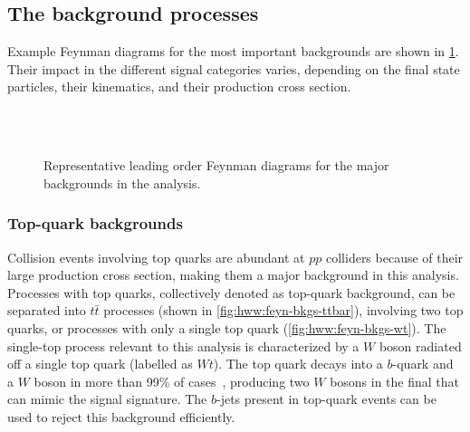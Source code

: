 \subsection{The background processes}
Example Feynman diagrams for the most important backgrounds are shown in \cref{fig:hww:feyn-bkgs}.
Their impact in the different signal categories varies, depending on the final state particles, their kinematics, and their production cross section. 
\captionsetup[subfloat]{captionskip=10pt}
\begin{figure}[ht]
     \hspace{5em}
     \\
     \hspace{5em}
     \\
     \hspace{5em}
    \caption[Feynman diagrams for the major backgrounds.]{Representative leading order Feynman diagrams for the major backgrounds in the \HWW analysis.} 
    \label{fig:hww:feyn-bkgs}
\end{figure}
\resetcaptionoffset

\subsubsection{Top-quark backgrounds}
Collision events involving top quarks are abundant at $pp$ colliders because of their large production cross section, making them a major background in this analysis.
Processes with top quarks, collectively denoted as top-quark background, can be separated into $t\bar{t}$ processes (shown in \cref{fig:hww:feyn-bkgs-ttbar}), involving two top quarks, or processes with only a single top quark (\cref{fig:hww:feyn-bkgs-wt}). 
The single-top process relevant to this analysis is characterized by a $W$ boson radiated off a single top quark (labelled as $Wt$). 
The top quark decays into a $b$-quark and a $W$ boson in more than 99\% of cases~\cite{PDG2020}, producing two $W$ bosons in the final that can mimic the signal signature. 
The $b$-jets present in top-quark events can be used to reject this background efficiently.

